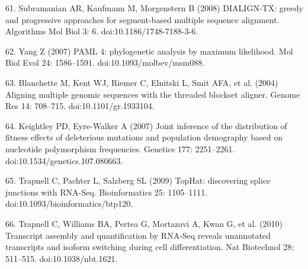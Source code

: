 61.	Subramanian AR, Kaufmann M, Morgenstern B (2008) DIALIGN-TX: greedy and progressive approaches for segment-based multiple sequence alignment. Algorithms Mol Biol 3: 6. doi:10.1186/1748-7188-3-6.

62.	Yang Z (2007) PAML 4: phylogenetic analysis by maximum likelihood. Mol Biol Evol 24: 1586–1591. doi:10.1093/molbev/msm088.

63.	Blanchette M, Kent WJ, Riemer C, Elnitski L, Smit AFA, et al. (2004) Aligning multiple genomic sequences with the threaded blockset aligner. Genome Res 14: 708–715. doi:10.1101/gr.1933104.

64.	Keightley PD, Eyre-Walker A (2007) Joint inference of the distribution of fitness effects of deleterious mutations and population demography based on nucleotide polymorphism frequencies. Genetics 177: 2251–2261. doi:10.1534/genetics.107.080663.

65.	Trapnell C, Pachter L, Salzberg SL (2009) TopHat: discovering splice junctions with RNA-Seq. Bioinformatics 25: 1105–1111. doi:10.1093/bioinformatics/btp120.

66.	Trapnell C, Williams BA, Pertea G, Mortazavi A, Kwan G, et al. (2010) Transcript assembly and quantification by RNA-Seq reveals unannotated transcripts and isoform switching during cell differentiation. Nat Biotechnol 28: 511–515. doi:10.1038/nbt.1621.
